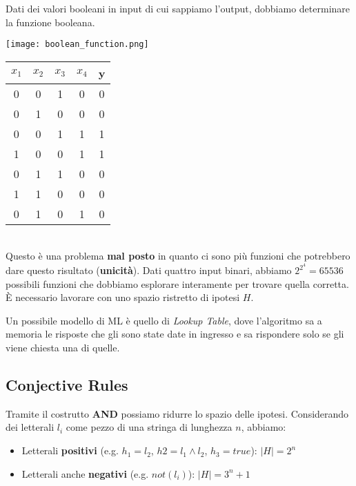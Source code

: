 \begin{example}
	Dati dei valori booleani in input di cui sappiamo l'output, dobbiamo determinare la funzione booleana.
	\begin{table}[!h]
		\centering
		\texttt{[image: boolean\_function.png]}
		\begin{tabular}{cccc|c}
			$x_1$ & $x_2$ & $x_3$ & $x_4$ & y \\
			\hline
			0 & 0 & 1 & 0 & 0 \\
			0 & 1 & 0 & 0 & 0 \\
			0 & 0 & 1 & 1 & 1 \\
			1 & 0 & 0  &1 & 1 \\
			0 & 1 & 1 & 0 & 0 \\
			1 & 1 & 0 & 0 & 0 \\
			0 & 1 & 0 & 1 & 0 \\
			\hline
		\end{tabular}
	\end{table}
	\\Questo è una problema \textbf{mal posto} in quanto ci sono più funzioni che potrebbero dare questo risultato (\textbf{unicità}).
	Dati quattro input binari, abbiamo $2^{2^4}= 65536 $ possibili funzioni che dobbiamo esplorare interamente per trovare quella corretta.\\
	È necessario lavorare con uno spazio ristretto di ipotesi $H$.
\end{example}
\begin{definition}
	Un possibile modello di ML è quello di \textit{Lookup Table}, dove l'algoritmo sa a memoria le risposte che gli sono state date in ingresso e sa rispondere solo se gli viene chiesta una di quelle.
\end{definition}
\subsection{Conjective Rules}
Tramite il costrutto \textbf{AND} possiamo ridurre lo spazio delle ipotesi. Considerando dei letterali $l_i$ come pezzo di una stringa di lunghezza $n$, abbiamo:
\begin{itemize}
	\item Letterali \textbf{positivi} (e.g. $h_1=l_2$, $h2=l_1 \land l_2$, $h_3=true$): $\lvert H \rvert = 2^n$
	\item Letterali anche \textbf{negativi} (e.g. $not(l_i)$): $\lvert H \rvert = 3^n + 1$
\end{itemize}

